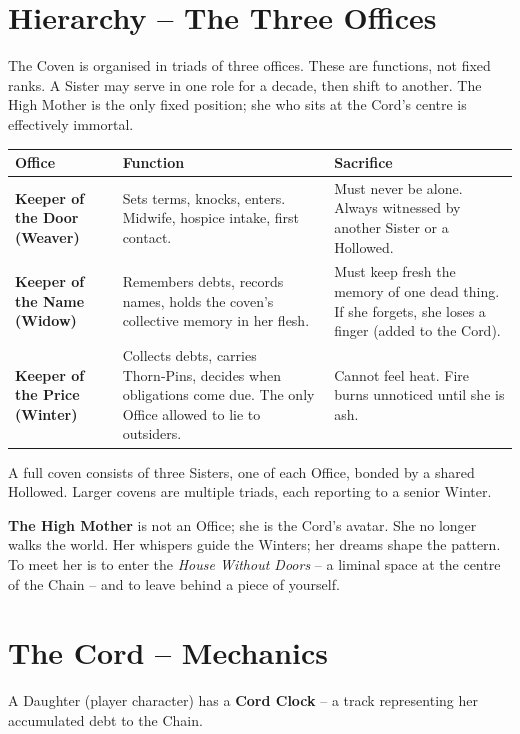 \documentclass[10pt,twoside]{book}
\begin{document}
\chapter{Hierarchy – The Three Offices}

The Coven is organised in triads of three offices. These are functions, not fixed ranks. A Sister may serve in one role for a decade, then shift to another. The High Mother is the only fixed position; she who sits at the Cord's centre is effectively immortal.

\begin{table}[htbp]
\centering
\begin{tabular}{>{\bfseries}l p{} p{}}
\toprule
Office & Function & Sacrifice \\
\midrule
Keeper of the Door (Weaver) & Sets terms, knocks, enters. Midwife, hospice intake, first contact. & Must never be alone. Always witnessed by another Sister or a Hollowed. \\
Keeper of the Name (Widow) & Remembers debts, records names, holds the coven's collective memory in her flesh. & Must keep fresh the memory of one dead thing. If she forgets, she loses a finger (added to the Cord). \\
Keeper of the Price (Winter) & Collects debts, carries Thorn‑Pins, decides when obligations come due. The only Office allowed to lie to outsiders. & Cannot feel heat. Fire burns unnoticed until she is ash. \\
\bottomrule
\end{tabular}
\end{table}

A full coven consists of three Sisters, one of each Office, bonded by a shared Hollowed. Larger covens are multiple triads, each reporting to a senior Winter.

\vspace{0.5cm}
\noindent\textbf{The High Mother} is not an Office; she is the Cord's avatar. She no longer walks the world. Her whispers guide the Winters; her dreams shape the pattern. To meet her is to enter the \textit{House Without Doors} – a liminal space at the centre of the Chain – and to leave behind a piece of yourself.

\chapter{The Cord – Mechanics}

A Daughter (player character) has a \textbf{Cord Clock} – a track representing her accumulated debt to the Chain.
\end{document}

